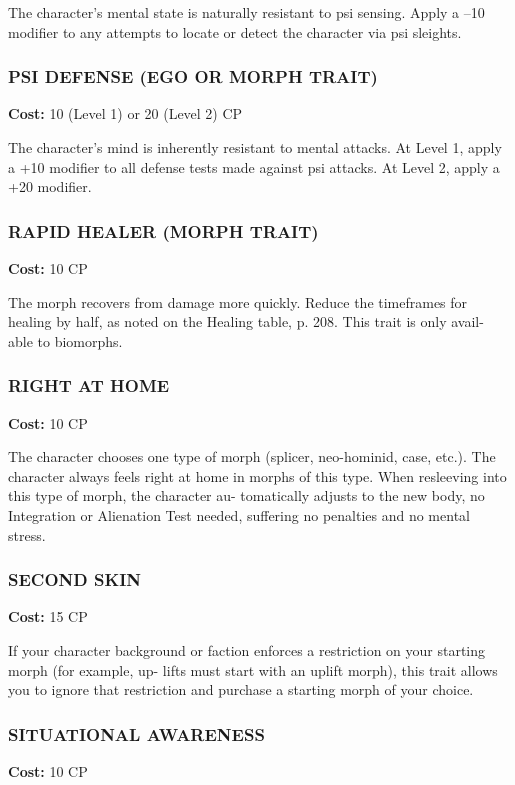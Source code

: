 The character’s mental state is naturally resistant to
psi sensing. Apply a –10 modifier to any attempts to
locate or detect the character via psi sleights.

\subsubsection{PSI DEFENSE (EGO OR MORPH TRAIT)}
\textbf{Cost:} 10 (Level 1) or 20 (Level 2) CP

The character’s mind is inherently resistant to
mental attacks. At Level 1, apply a +10 modifier to
all defense tests made against psi attacks. At Level 2,
apply a +20 modifier.

\subsubsection{RAPID HEALER (MORPH TRAIT)}
\textbf{Cost:} 10 CP

The morph recovers from damage more quickly.
Reduce the timeframes for healing by half, as noted
on the Healing table, p. 208. This trait is only avail-
able to biomorphs.

\subsubsection{RIGHT AT HOME}
\textbf{Cost:} 10 CP

The character chooses one type of morph (splicer,
neo-hominid, case, etc.). The character always
feels right at home in morphs of this type. When
resleeving into this type of morph, the character au-
tomatically adjusts to the new body, no Integration
or Alienation Test needed, suffering no penalties and
no mental stress.

\subsubsection{SECOND SKIN}
\textbf{Cost:} 15 CP

If your character background or faction enforces a
restriction on your starting morph (for example, up-
lifts must start with an uplift morph), this trait allows
you to ignore that restriction and purchase a starting
morph of your choice.

\subsubsection{SITUATIONAL AWARENESS}
\textbf{Cost:} 10 CP

